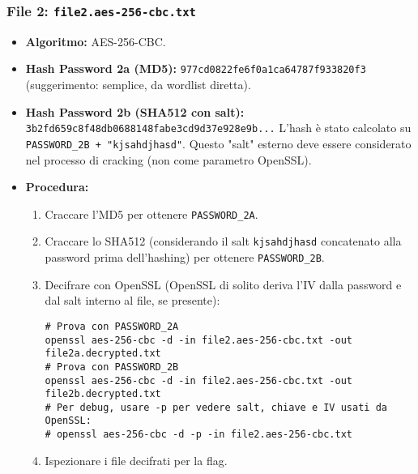 \subsubsection{File 2: \texttt{file2.aes-256-cbc.txt}}
\begin{itemize}
    \item \textbf{Algoritmo:} AES-256-CBC.
    \item \textbf{Hash Password 2a (MD5):} \texttt{977cd0822fe6f0a1ca64787f933820f3} (suggerimento: semplice, da wordlist diretta).
    \item \textbf{Hash Password 2b (SHA512 con salt):} \texttt{3b2fd659c8f48db0688148fabe3cd9d37e928e9b...}
    L'hash è stato calcolato su \texttt{PASSWORD\_2B + "kjsahdjhasd"}. Questo "salt" esterno deve essere considerato nel processo di cracking (non come parametro OpenSSL).
    \item \textbf{Procedura:}
    \begin{enumerate}
        \item Craccare l'MD5 per ottenere \texttt{PASSWORD\_2A}.
        \item Craccare lo SHA512 (considerando il salt \texttt{kjsahdjhasd} concatenato alla password prima dell'hashing) per ottenere \texttt{PASSWORD\_2B}.
        \item Decifrare con OpenSSL (OpenSSL di solito deriva l'IV dalla password e dal salt interno al file, se presente):
        \begin{verbatim}
# Prova con PASSWORD_2A
openssl aes-256-cbc -d -in file2.aes-256-cbc.txt -out file2a.decrypted.txt
# Prova con PASSWORD_2B
openssl aes-256-cbc -d -in file2.aes-256-cbc.txt -out file2b.decrypted.txt
# Per debug, usare -p per vedere salt, chiave e IV usati da OpenSSL:
# openssl aes-256-cbc -d -p -in file2.aes-256-cbc.txt
        \end{verbatim}
        \item Ispezionare i file decifrati per la flag.
    \end{enumerate}
\end{itemize}

